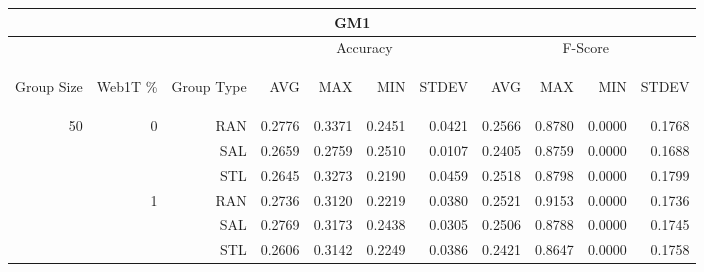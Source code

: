 \begin{center}
\begin{table}[htbp] 
 \begin{center}
\begin{tabular}{ | r | r | r | r | r | r | r | r | r | r | r |}
\hline
\multicolumn{11}{|c|}{GM1}\\
\hline
 & & & \multicolumn{4}{|c|}{Accuracy} & \multicolumn{4}{|c|}{F-Score}\\ \cline{4-11}
\begin{sideways}Group Size\end{sideways} & \begin{sideways}Web1T \%\end{sideways} & \begin{sideways}Group Type\end{sideways} & \begin{sideways}AVG\end{sideways} & \begin{sideways}MAX\end{sideways} & \begin{sideways}MIN\end{sideways} & \begin{sideways}STDEV\end{sideways} & \begin{sideways}AVG\end{sideways} & \begin{sideways}MAX\end{sideways} & \begin{sideways}MIN\end{sideways} & \begin{sideways}STDEV\end{sideways}\\
\hline
\multirow{18}{*}{50}
 & \multirow{3}{*}{0} & RAN & 0.2776 & 0.3371 & 0.2451 & 0.0421 & 0.2566 & 0.8780 & 0.0000 & 0.1768\\ \cline{3-11}
 &   & SAL & 0.2659 & 0.2759 & 0.2510 & 0.0107 & 0.2405 & 0.8759 & 0.0000 & 0.1688\\ \cline{3-11}
 &   & STL & 0.2645 & 0.3273 & 0.2190 & 0.0459 & 0.2518 & 0.8798 & 0.0000 & 0.1799\\ \cline{2-11}
 & \multirow{3}{*}{1} & RAN & 0.2736 & 0.3120 & 0.2219 & 0.0380 & 0.2521 & 0.9153 & 0.0000 & 0.1736\\ \cline{3-11}
 &   & SAL & 0.2769 & 0.3173 & 0.2438 & 0.0305 & 0.2506 & 0.8788 & 0.0000 & 0.1745\\ \cline{3-11}
 &   & STL & 0.2606 & 0.3142 & 0.2249 & 0.0386 & 0.2421 & 0.8647 & 0.0000 & 0.1758\\ \cline{2-11}

\end{tabular}
\end{center}
\end{table}
\end{center}
